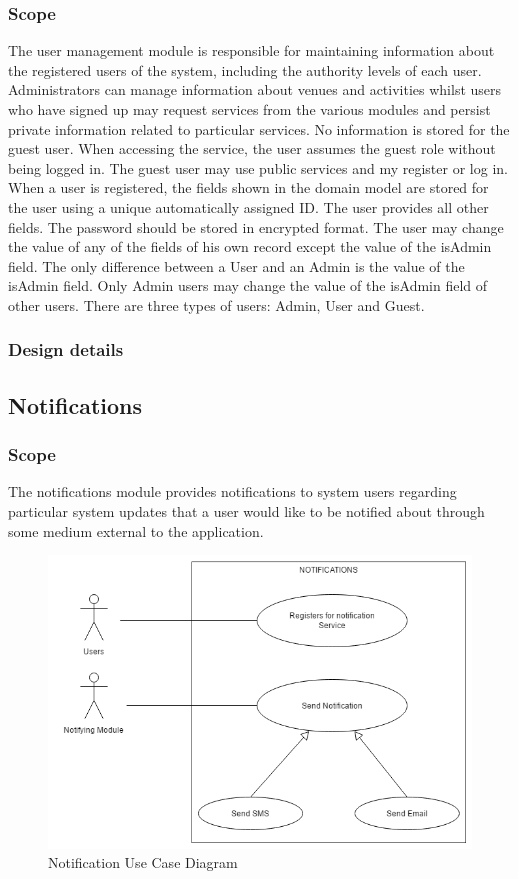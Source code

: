 \documentclass{article}
\begin{document}
\subsubsection{Scope}
The user management module is responsible for maintaining information about the registered
users of the system, including the authority levels of each user. Administrators can
manage information about venues and activities whilst users who have signed up
may request services from the various modules and persist private information
related to particular services.\newline
No information is stored for the guest user. When accessing the service, the user
assumes the guest role without being logged in. The guest user may use public
services and my register or log in.
When a user is registered, the fields shown in the domain model are stored for the
user using a unique automatically assigned ID. The user provides all other fields. The
password should be stored in encrypted format. The user may change the value of
any of the fields of his own record except the value of the isAdmin field.
The only difference between a User and an Admin is the value of the isAdmin field.
Only Admin users may change the value of the isAdmin field of other users.
There are three types of users: Admin, User and Guest.

\subsubsection{Design details}

\subsection{Notifications}
\subsubsection{Scope}
 The notifications module provides notifications to system users regarding
    particular system updates that a user would like to be notified about through
    some medium external to the application.
    
    \begin{figure}[h!]
        \includegraphics[width=\textwidth]{Notifications/img/Notifications_Use_Case.png}\caption{Notification Use Case Diagram}
    \end{figure}
 
\end{document}
